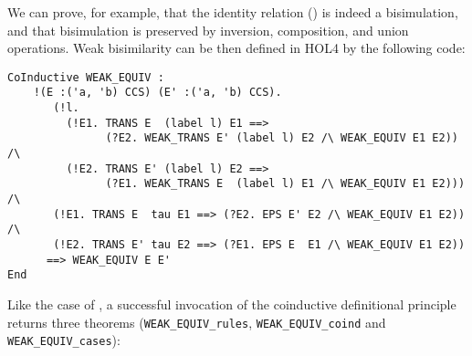We can prove, for example, that the identity relation ()
is indeed a bisimulation, and that
bisimulation is preserved by inversion, composition, and union operations.
Weak bisimilarity can be then defined in HOL4 by the following code:
\begin{lstlisting}
CoInductive WEAK_EQUIV :
    !(E :('a, 'b) CCS) (E' :('a, 'b) CCS).
       (!l.
         (!E1. TRANS E  (label l) E1 ==>
               (?E2. WEAK_TRANS E' (label l) E2 /\ WEAK_EQUIV E1 E2)) /\
         (!E2. TRANS E' (label l) E2 ==>
               (?E1. WEAK_TRANS E  (label l) E1 /\ WEAK_EQUIV E1 E2))) /\
       (!E1. TRANS E  tau E1 ==> (?E2. EPS E' E2 /\ WEAK_EQUIV E1 E2)) /\
       (!E2. TRANS E' tau E2 ==> (?E1. EPS E  E1 /\ WEAK_EQUIV E1 E2))
      ==> WEAK_EQUIV E E'
End
\end{lstlisting}
Like the case of , a successful invocation of the
coinductive definitional principle returns three
theorems (\texttt{WEAK_EQUIV_rules}, \texttt{WEAK_EQUIV_coind} and
\texttt{WEAK_EQUIV_cases}):

